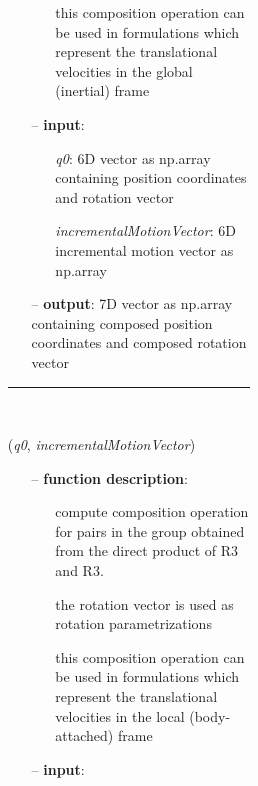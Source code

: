 \begin{itemize}[leftmargin=1.4cm]
\begin{itemize}[leftmargin=0.5cm]
\begin{itemize}[leftmargin=1.4cm]
\begin{itemize}[leftmargin=0.5cm]
\begin{itemize}[leftmargin=1.4cm]
\begin{itemize}[leftmargin=0.5cm]
\begin{itemize}[leftmargin=1.4cm]
\begin{itemize}[leftmargin=1.4cm]
\begin{itemize}[leftmargin=1.4cm]
\begin{itemize}[leftmargin=1.4cm]
\begin{itemize}[leftmargin=0.5cm]
\begin{itemize}[leftmargin=0.7cm]
\begin{itemize}[leftmargin=1.2cm]
    \item[]             this composition operation can be used in formulations which represent the translational velocities in the global (inertial) frame
  \end{itemize}
  \item[--]  {\bf input}: \vspace{-6pt}
  \begin{itemize}[leftmargin=1.2cm]
\setlength{\itemindent}{-0.7cm}
    \item[] {\it q0}: 6D vector as np.array containing position coordinates and rotation vector
    \item[] {\it   incrementalMotionVector}: 6D incremental motion vector as np.array
  \end{itemize}
  \item[--]  {\bf output}: 7D vector as np.array containing composed position coordinates and composed rotation vector\vspace{12pt}\end{itemize}
%
\noindent\rule{8cm}{0.75pt}\vspace{1pt} \\ 
\begin{flushleft}
\label{sec:lieGroupBasics:CompositionRuleSemiDirectProductR3AndR3RotVec}
({\it q0}, {\it incrementalMotionVector})
\end{flushleft}
\setlength{\itemindent}{0.7cm}
\begin{itemize}[leftmargin=0.7cm]
  \item[--]  {\bf function description}: \vspace{-6pt}
  \begin{itemize}[leftmargin=1.2cm]
\setlength{\itemindent}{-0.7cm}
    \item[] compute composition operation for pairs in the group obtained from the direct product of R3 and R3.
    \item[]             the rotation vector is used as rotation parametrizations
    \item[]             this composition operation can be used in formulations which represent the translational velocities in the local (body-attached) frame
  \end{itemize}
  \item[--]  {\bf input}: \vspace{-6pt}
  \begin{itemize}[leftmargin=1.2cm]

\end{itemize}
\end{itemize}
\end{itemize}
\end{itemize}
\end{itemize}
\end{itemize}
\end{itemize}
\end{itemize}
\end{itemize}
\end{itemize}
\end{itemize}
\end{itemize}
\end{itemize}
